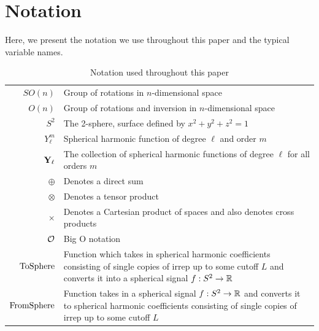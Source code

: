 \section{Notation}
\label{sec:notation}
Here, we present the notation we use throughout this paper and the typical variable names.
\begin{table}[h!]
    \centering
    \caption{Notation used throughout this paper}
    \vspace{0.15in}
    \begin{tabular}{rp{}}
        $SO(n)$ & Group of rotations in $n$-dimensional space\\
        $O(n)$ & Group of rotations and inversion in $n$-dimensional space\\
        $S^2$ & The 2-sphere, surface defined by $x^2+y^2+z^2=1$\\
        $Y^m_\ell$ & Spherical harmonic function of degree $\ell$ and order $m$\\
        $\mathbf{Y}_\ell$ & The collection of spherical harmonic functions of degree $\ell$ for all orders $m$\\
        $\oplus$ & Denotes a direct sum\\
        $\otimes$ & Denotes a tensor product\\
        $\times$ & Denotes a Cartesian product of spaces and also denotes cross products\\
        $\mathcal{O}$ & Big O notation\\
        $\mathrm{ToSphere}$ & Function which takes in spherical harmonic coefficients consisting of single copies of irrep up to some cutoff $L$ and converts it into a spherical signal $f:S^2\to\mathbb{R}$\\
        $\mathrm{FromSphere}$ & Function takes in a spherical signal $f:S^2\to\mathbb{R}$ and converts it to spherical harmonic coefficients consisting of single copies of irrep up to some cutoff $L$
    \end{tabular}
    \label{tab:notation}
\end{table}

